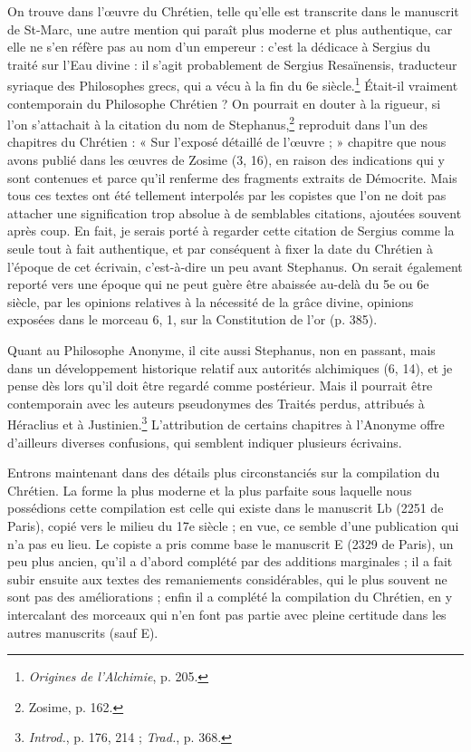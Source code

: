 \documentclass[a4paper, 11pt, oneside, polutonikogreek, french]{article}
\begin{document}
On trouve dans l'œuvre du Chrétien, telle qu'elle est transcrite dans le manuscrit de St-Marc, une autre mention qui paraît plus moderne et plus authentique, car elle ne s'en réfère pas au nom d'un empereur : c'est la dédicace à Sergius du traité sur l'Eau divine : il s'agit probablement de Sergius Resaïnensis, traducteur syriaque des Philosophes grecs, qui a vécu à la fin du 6e siècle.\footnote{\emph{Origines de l'Alchimie}, p. 205.} Était-il vraiment contemporain du Philosophe Chrétien ? On pourrait en douter à la rigueur, si l'on s'attachait à la citation du nom de Stephanus,\footnote{Zosime, p. 162.} reproduit dans l'un des chapitres du Chrétien : « Sur l'exposé détaillé de l'œuvre ; » chapitre que nous avons publié dans les œuvres de Zosime (3, 16), en raison des indications qui y sont contenues et parce qu'il renferme des fragments extraits de Démocrite. Mais tous ces textes ont été tellement interpolés par les copistes que l'on ne doit pas attacher une signification trop absolue à de semblables citations, ajoutées souvent après coup. En fait, je serais porté à regarder cette citation de Sergius comme la seule tout à fait authentique, et par conséquent à fixer la date du Chrétien à l'époque de cet écrivain, c'est-à-dire un peu avant Stephanus. On serait également reporté vers une époque qui ne peut guère être abaissée au-delà du 5e ou 6e siècle, par les opinions relatives à la nécessité de la grâce divine, opinions exposées dans le morceau 6, 1, sur la Constitution de l'or (p. 385).

Quant au Philosophe Anonyme, il cite aussi Stephanus, non en passant, mais dans un développement historique relatif aux autorités alchimiques (6, 14), et je pense dès lors qu'il doit être regardé comme postérieur. Mais il pourrait être contemporain avec les auteurs pseudonymes des Traités perdus, attribués à Héraclius et à Justinien.\footnote{\emph{Introd.}, p. 176, 214 ; \emph{Trad.}, p. 368.} L'attribution de certains chapitres à l'Anonyme offre d'ailleurs diverses confusions, qui semblent indiquer plusieurs écrivains.

Entrons maintenant dans des détails plus circonstanciés sur la compilation du Chrétien. La forme la plus moderne et la plus parfaite sous laquelle nous possédions cette compilation est celle qui existe dans le manuscrit Lb (2251 de Paris), copié vers le milieu du 17e siècle ; en vue, ce semble d'une publication qui n'a pas eu lieu. Le copiste a pris comme base le manuscrit E (2329 de Paris), un peu plus ancien, qu'il a d'abord complété par des additions marginales ; il a fait subir ensuite aux textes des remaniements considérables, qui le plus souvent ne sont pas des améliorations ; enfin il a complété la compilation du Chrétien, en y intercalant des morceaux qui n'en font pas partie avec pleine certitude dans les autres manuscrits (sauf E).
\end{document}
